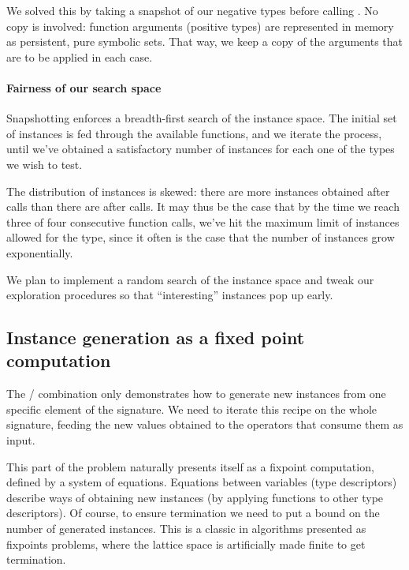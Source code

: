 We solved this by taking a snapshot of our negative types before calling
. No copy is involved: function arguments (positive types) are
represented in memory as persistent, pure symbolic sets. That way, we keep a
copy of the arguments that are to be applied in each  case.

\paragraph{Fairness of our search space}
Snapshotting enforces a breadth-first search of the instance space. The initial
set of instances is fed through the available functions, and we iterate the
process, until we've obtained a satisfactory number of instances for each one of
the types we wish to test.

The distribution of instances is skewed: there are more instances obtained after
 calls than there are after  calls. It may thus be the case
that by the time we reach three of four consecutive function calls, we've hit
the maximum limit of instances allowed for the type, since it often is the case
that the number of instances grow exponentially.

We plan to implement a random search of the instance space and tweak our
exploration procedures so that ``interesting'' instances pop up early.

\subsection{Instance generation as a fixed point computation}

The / combination only demonstrates how to
generate new instances from one specific element of the signature. We
need to iterate this recipe on the whole signature, feeding the new
values obtained to the operators that consume them as input.

This part of the problem naturally presents itself as a fixpoint
computation, defined by a system of equations. Equations between
variables (type descriptors) describe ways of obtaining new instances
(by applying functions to other type descriptors). Of course, to
ensure termination we need to put a bound on the number of generated
instances. This is a classic in algorithms presented as fixpoints
problems, where the lattice space is artificially made finite to get
termination.

